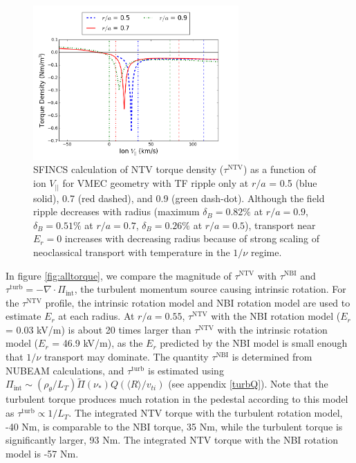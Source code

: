\documentclass[aip, pop, preprint]{revtex4-1}
\numberwithin{figure}{section}
\numberwithin{equation}{section}
\begin{document}
\begin{figure}[h!]
\centering
\includegraphics[width=0.7\textwidth]
{Torque_radiusscaling.png}
\caption{\label{fig:Torque_radiusscaling} SFINCS calculation of NTV torque density ($\tau^{\text{NTV}}$) as a function of ion $V_{||}$ for VMEC geometry with TF ripple only at $r/a$ = 0.5 (blue solid), 0.7 (red dashed), and 0.9 (green dash-dot). Although the field ripple decreases with radius (maximum $\delta_B = 0.82\%$ at $r/a = 0.9$, $\delta_B = 0.51\%$ at $r/a = 0.7$, $\delta_B = 0.26\%$ at $r/a = 0.5$), transport near $E_r = 0$ increases with decreasing radius because of strong scaling of neoclassical transport with temperature in the $1/\nu$ regime.\cite{Shaing2003}}
\end{figure}

In figure \ref{fig:alltorque}, we compare the magnitude of $\tau^{\text{NTV}}$ with $\tau^{\text{NBI}}$ and $\tau^{\text{turb}} = -\nabla \cdot \Pi_{\text{int}}$, the turbulent momentum source causing intrinsic rotation. For the $\tau^{\text{NTV}}$ profile, the intrinsic rotation model and NBI rotation model are used to estimate $E_r$ at each radius. At $r/a = 0.55$, $\tau^{\text{NTV}}$ with the NBI rotation model ($E_r$ = 0.03 kV/m) is about 20 times larger than $\tau^{\text{NTV}}$ with the intrinsic rotation model ($E_r$ = 46.9 kV/m), as the $E_r$ predicted by the NBI model is small enough that $1/\nu$ transport may dominate. The quantity $\tau^{\text{NBI}}$ is determined from NUBEAM calculations,\cite{Poli2014} and $\tau^{\text{turb}}$ is estimated using $\Pi_{\text{int}} \sim (\rho_{\theta}/L_T) \widetilde{\Pi}(\nu_*) Q (\langle R \rangle/v_{ti})$ (see appendix \ref{turbQ}). Note that the turbulent torque produces much rotation in the pedestal according to this model as $\tau^{\text{turb}} \propto 1/L_T$. The integrated NTV torque with the turbulent rotation model, -40 Nm, is comparable to the NBI torque, 35 Nm, while the turbulent torque is significantly larger, 93 Nm. The integrated NTV torque with the NBI rotation model is -57 Nm.
\end{document}
